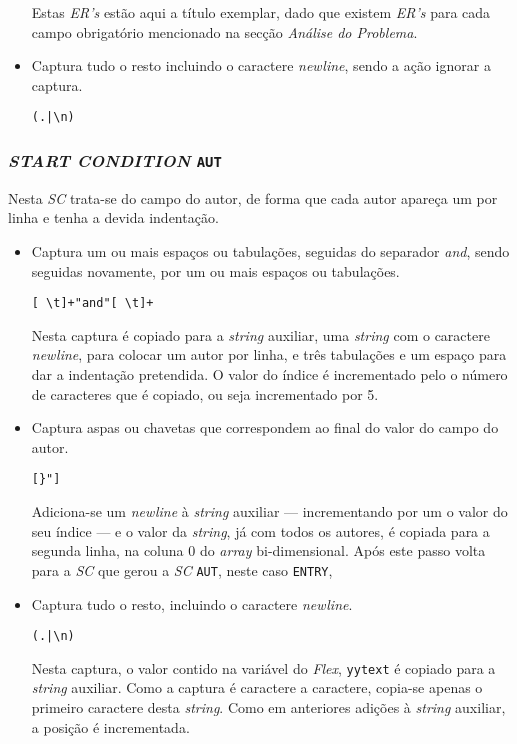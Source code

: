 \begin{itemize}
Estas \emph{ER's} estão aqui a título exemplar, dado que existem \emph{ER's}
para cada campo obrigatório mencionado na secção \emph{Análise do Problema}.


\item Captura tudo o resto incluindo o caractere \emph{newline}, sendo a ação
	ignorar a captura.
\begin{verbatim}
(.|\n)
\end{verbatim}



\end{itemize}


\subsubsection{\emph{START CONDITION} \texttt{AUT}}
Nesta \emph{SC} trata-se do campo do autor, de forma que cada autor apareça um
por linha e tenha a devida indentação.
\begin{itemize}
\item Captura um ou mais espaços ou tabulações, seguidas do separador
	\emph{and}, sendo seguidas novamente, por um ou mais espaços ou tabulações.
\begin{verbatim}
[ \t]+"and"[ \t]+
\end{verbatim}

Nesta captura é copiado para a \emph{string} auxiliar, uma \emph{string} com
o caractere \emph{newline}, para colocar um autor por linha, e três tabulações
e um espaço para dar a indentação pretendida. O valor do índice é incrementado
pelo o número de caracteres que é copiado, ou seja incrementado por 5.


\item Captura aspas ou chavetas que correspondem ao final do valor do campo do
	autor.
\begin{verbatim}
[}"] 
\end{verbatim}

Adiciona-se um \emph{newline} à \emph{string} auxiliar --- incrementando por um
o valor do seu índice --- e o valor da \emph{string}, já com todos os autores,
é copiada para a segunda linha, na coluna $0$ do \emph{array}
bi-dimensional. Após este passo volta para a \emph{SC} que gerou a \emph{SC}
\texttt{AUT}, neste caso \texttt{ENTRY}, 

\item Captura tudo o resto, incluindo o caractere \emph{newline}.
\begin{verbatim}
(.|\n)
\end{verbatim}

Nesta captura, o valor contido na variável do \emph{Flex}, \texttt{yytext}
é copiado para a \emph{string} auxiliar. Como a captura é caractere a caractere,
copia-se apenas o primeiro caractere desta \emph{string}. Como em anteriores
adições à \emph{string} auxiliar, a posição é incrementada.


\end{itemize}


